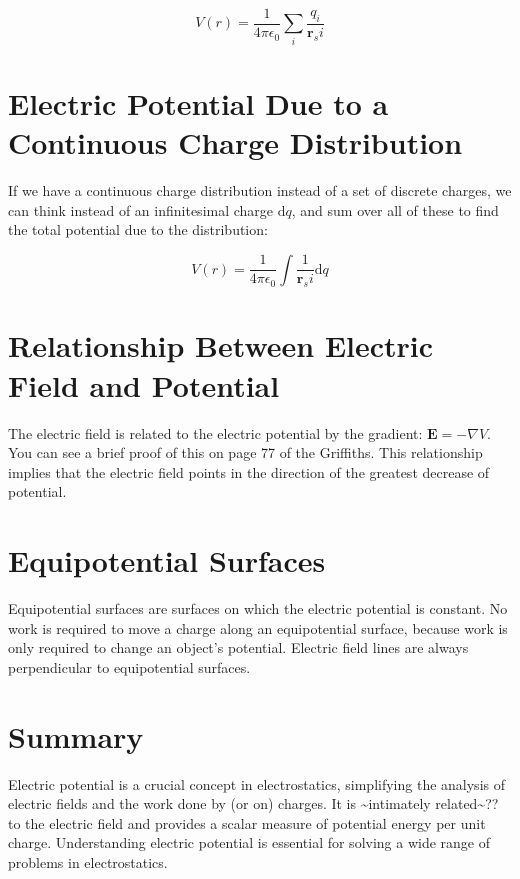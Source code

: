 \documentclass[
  letterpaper,
  DIV=11,
  numbers=noendperiod]{scrreprt}
\begin{document}
\[ V(r) = \frac{1}{4\pi \epsilon_0} \sum_{i} \frac{q_i}{\mathrm{\mathbf{r}}_si} \]

\section{Electric Potential Due to a Continuous Charge
Distribution}\label{electric-potential-due-to-a-continuous-charge-distribution}

If we have a continuous charge distribution instead of a set of discrete
charges, we can think instead of an infinitesimal charge
\(\mathrm{d}q\), and sum over all of these to find the total potential
due to the distribution:

\[ V(r) = \frac{1}{4\pi \epsilon_0} \int \frac{1}{\mathrm{\mathbf{r}}_si} \mathrm{d}q \]

\section{Relationship Between Electric Field and
Potential}\label{relationship-between-electric-field-and-potential}

The electric field is related to the electric potential by the gradient:
\(\mathrm{\mathbf{E}}= -\nabla V\). You can see a brief proof of this on
page 77 of the Griffiths. This relationship implies that the electric
field points in the direction of the greatest decrease of potential.

\section{Equipotential Surfaces}\label{equipotential-surfaces}

Equipotential surfaces are surfaces on which the electric potential is
constant. No work is required to move a charge along an equipotential
surface, because work is only required to change an object's potential.
Electric field lines are always perpendicular to equipotential surfaces.

\section{Summary}\label{summary-1}

Electric potential is a crucial concept in electrostatics, simplifying
the analysis of electric fields and the work done by (or on) charges. It
is \textasciitilde intimately related\textasciitilde?? to the electric
field and provides a scalar measure of potential energy per unit charge.
Understanding electric potential is essential for solving a wide range
of problems in electrostatics.
\end{document}
